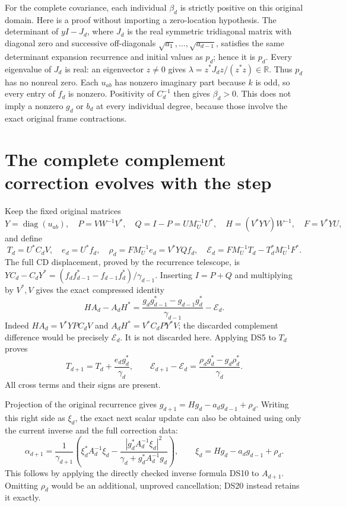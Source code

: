 \documentclass[11pt]{article}
\newcommand{\R}{\mathbb R}
\begin{document}
For the complete covariance, each individual \(\beta_d\) is strictly
positive on this original domain. Here is a proof without importing a
zero-location hypothesis. The determinant of \(yI-J_d\), where
\(J_d\) is the real symmetric tridiagonal matrix with diagonal zero
and successive off-diagonals \(\sqrt{a_1},\ldots,\sqrt{a_{d-1}}\),
satisfies the same determinant expansion recurrence and initial values
as \(p_d\); hence it is \(p_d\). Every eigenvalue of \(J_d\) is
real: an eigenvector \(z\ne0\) gives
\(\lambda=z^*J_dz/(z^*z)\in\R\). Thus \(p_d\) has no nonreal
zero. Each \(u_{ab}\) has nonzero imaginary part because \(k\) is
odd, so every entry of \(f_d\) is nonzero. Positivity of
\(C_d^{-1}\) then gives \(\beta_d>0\). This does not imply a
nonzero \(g_d\) or \(b_d\) at every individual degree, because those
involve the exact original frame contractions.

\section{The complete complement correction evolves with the step}

Keep the fixed original matrices
\[
Y=\operatorname{diag}(u_{ab}),\quad
P=VW^{-1}V^*,\quad Q=I-P=UM_U^{-1}U^*,\quad
H=(V^*YV)W^{-1},\quad F=V^*YU,
\]
and define
\[
T_d=U^*C_dV,\quad e_d=U^*f_d,\quad
\rho_d=FM_U^{-1}e_d=V^*YQf_d,
\quad \mathcal E_d=FM_U^{-1}T_d-T_d^*M_U^{-1}F^*.
\]
The full CD displacement, proved by the recurrence telescope, is
\(YC_d-C_dY^*=(f_df_{d-1}^*-f_{d-1}f_d^*)/\gamma_{d-1}\).
Inserting \(I=P+Q\) and multiplying by \(V^*,V\) gives the exact
compressed identity
\begin{equation}\label{eq:correctedCD}
HA_d-A_dH^*
=\frac{g_dg_{d-1}^*-g_{d-1}g_d^*}{\gamma_{d-1}}
-\mathcal E_d.
\tag{DS18}
\end{equation}
Indeed \(HA_d=V^*YPC_dV\) and
\(A_dH^*=V^*C_dPY^*V\); the discarded complement difference would
be precisely \(\mathcal E_d\). It is not discarded here.
Applying DS5 to \(T_d\) proves
\begin{equation}\label{eq:correctionstep}
\boxed{T_{d+1}=T_d+\frac{e_dg_d^*}{\gamma_d},\qquad
\mathcal E_{d+1}-\mathcal E_d
=\frac{\rho_dg_d^*-g_d\rho_d^*}{\gamma_d}.}
\tag{DS19}
\end{equation}
All cross terms and their signs are present.

Projection of the original recurrence gives
\(g_{d+1}=Hg_d-a_dg_{d-1}+\rho_d\).
Writing this right side as \(\xi_d\), the exact next scalar update can
also be obtained using only the current inverse and the full correction
data:
\begin{equation}\label{eq:nextalpha}
\alpha_{d+1}=\frac1{\gamma_{d+1}}
\left(\xi_d^*A_d^{-1}\xi_d
-\frac{|g_d^*A_d^{-1}\xi_d|^2}
{\gamma_d+g_d^*A_d^{-1}g_d}\right),
\qquad\xi_d=Hg_d-a_dg_{d-1}+\rho_d.
\tag{DS20}
\end{equation}
This follows by applying the directly checked inverse formula DS10
to \(A_{d+1}\). Omitting \(\rho_d\) would be an additional,
unproved cancellation; DS20 instead retains it exactly.
\end{document}

